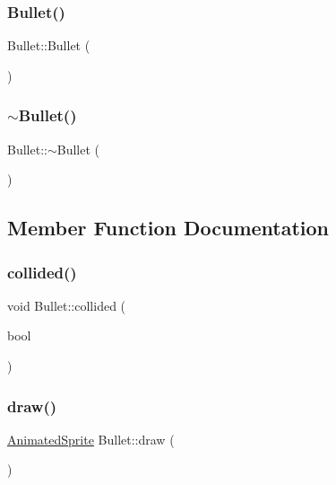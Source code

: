 \subsubsection{\texorpdfstring{Bullet()}{Bullet()}}
{\footnotesize\ttfamily Bullet\+::\+Bullet (\begin{DoxyParamCaption}{ }\end{DoxyParamCaption})}

\hypertarget{class_bullet_aaeb5cb41d7db89f49007b08b41f1bfcf}{}\label{class_bullet_aaeb5cb41d7db89f49007b08b41f1bfcf} 
\subsubsection{\texorpdfstring{$\sim$\+Bullet()}{~Bullet()}}
{\footnotesize\ttfamily Bullet\+::$\sim$\+Bullet (\begin{DoxyParamCaption}{ }\end{DoxyParamCaption})}



\subsection{Member Function Documentation}
\hypertarget{class_bullet_a49da1f5862bcb89f36588ead6e620c06}{}\label{class_bullet_a49da1f5862bcb89f36588ead6e620c06} 
\subsubsection{\texorpdfstring{collided()}{collided()}}
{\footnotesize\ttfamily void Bullet\+::collided (\begin{DoxyParamCaption}\item[{bool}]{ }\end{DoxyParamCaption})}

\hypertarget{class_bullet_abd80643d0485e32232ad46cc2087de40}{}\label{class_bullet_abd80643d0485e32232ad46cc2087de40} 
\subsubsection{\texorpdfstring{draw()}{draw()}}
{\footnotesize\ttfamily \hyperlink{class_animated_sprite}{Animated\+Sprite} Bullet\+::draw (\begin{DoxyParamCaption}{ }\end{DoxyParamCaption})}

